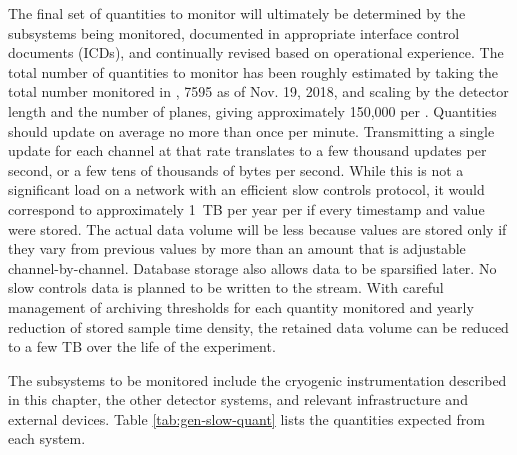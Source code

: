 The final set of quantities to monitor will ultimately be determined
by the subsystems being monitored, documented in
appropriate  interface control documents (ICDs), and continually revised based on operational
experience.  The total number of quantities to monitor has been roughly estimated by taking the total number monitored
in \cite{pdspdcs_proc}, 7595 as of Nov. 19, 2018, and scaling by the detector length and the number of planes, giving approximately 150,000 per .
Quantities should update on average no more than once per minute.
Transmitting a single update for each channel at that rate translates to a few thousand updates per second, or a few tens of thousands of bytes per second. While this is not a significant load on a network with an efficient slow controls protocol, it would correspond to approximately 1~TB per year per  if every timestamp and value were stored.
The actual data volume will be less because values are stored only if they vary from previous values by more than an amount that is adjustable channel-by-channel.
Database storage also allows data to be sparsified later.
No slow controls data is planned to be written to the  stream.
With careful management of archiving thresholds for each quantity monitored and yearly reduction of stored sample time density, the retained data volume can be reduced to a few TB over the life of the experiment.

The subsystems
to be monitored include the %
cryogenic instrumentation
described in this chapter, the other detector systems, and relevant
infrastructure and external devices. Table \ref{tab:gen-slow-quant}
lists the quantities expected from each system.

